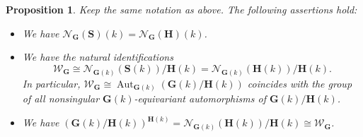 \documentclass[11pt]{amsart}
\numberwithin{equation}{section}
\theoremstyle{plain}
\newtheorem{prop}[thm]{Proposition}
\theoremstyle{definition}
\newcommand{\Aut}{\operatorname{Aut}}
\begin{document}
\begin{prop}\label{prop-weyl}
Keep the same notation as above. The following assertions hold:
\begin{itemize}
\item [$(\rm i)$] We have $\mathscr N_{\mathbf G}(\mathbf S)(k) = \mathscr N_{\mathbf G}(\mathbf H)(k)$.
\item [$(\rm ii)$] We have the natural identifications 
$$\mathscr W_{\mathbf G} \cong \mathscr N_{\mathbf G(k)}(\mathbf S(k))/\mathbf H(k) = \mathscr N_{\mathbf G(k)}(\mathbf H(k))/\mathbf H(k).$$
In particular, $\mathscr W_{\mathbf G} \cong \Aut_{\mathbf G(k)}(\mathbf G(k)/\mathbf H(k))$ coincides with the group of all nonsingular $\mathbf G(k)$-equivariant automorphisms of $\mathbf G(k)/\mathbf H(k)$.
\item [$(\rm iii)$] We have $(\mathbf G(k)/\mathbf H(k))^{\mathbf H(k)} = \mathscr N_{\mathbf G(k)}(\mathbf H(k))/\mathbf H(k) \cong \mathscr W_{\mathbf G}$.
\end{itemize}
\end{prop}
\end{document}
